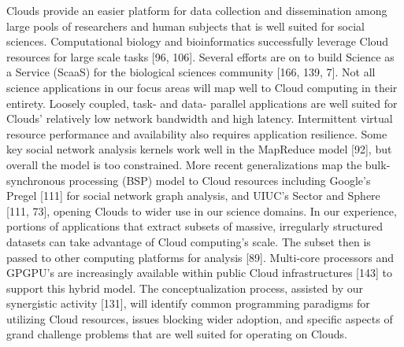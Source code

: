 Clouds provide an easier platform for data collection and dissemination among large pools of
researchers and human subjects that is well suited for social sciences. Computational biology and
bioinformatics successfully leverage Cloud resources for large scale tasks [96, 106]. Several efforts
are on to build Science as a Service (ScaaS) for the biological sciences community [166, 139, 7].
Not all science applications in our focus areas will map well to Cloud computing in their entirety.
Loosely coupled, task- and data- parallel applications are well suited for Clouds’ relatively low
network bandwidth and high latency. Intermittent virtual resource performance and availability
also requires application resilience. Some key social network analysis kernels work well in the
MapReduce model [92], but overall the model is too constrained. More recent generalizations map
the bulk-synchronous processing (BSP) model to Cloud resources including Google’s Pregel [111]
for social network graph analysis, and UIUC’s Sector and Sphere [111, 73], opening Clouds to
wider use in our science domains. In our experience, portions of applications that extract subsets of
massive, irregularly structured datasets can take advantage of Cloud computing’s scale. The subset
then is passed to other computing platforms for analysis [89]. Multi-core processors and GPGPU’s
are increasingly available within public Cloud infrastructures [143] to support this hybrid model.
The conceptualization process, assisted by our synergistic activity [131], will identify common
programming paradigms for utilizing Cloud resources, issues blocking wider adoption, and specific
aspects of grand challenge problems that are well suited for operating on Clouds.
